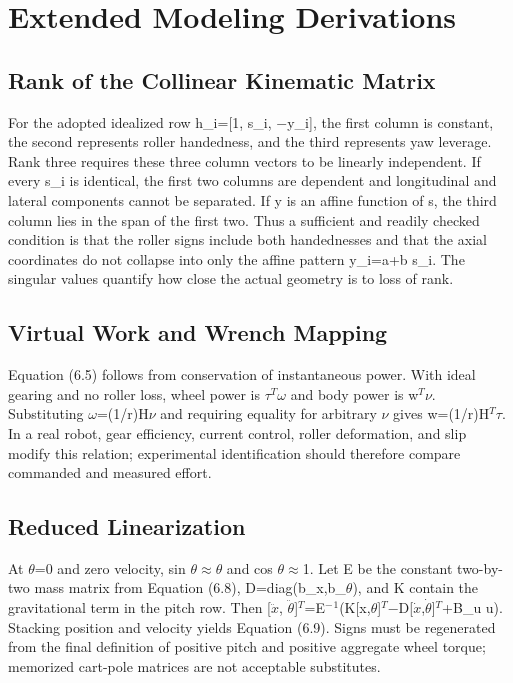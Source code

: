 \chapter{Extended Modeling Derivations}\label{ch:extended-modeling-derivations}

\section{Rank of the Collinear Kinematic Matrix}\label{f.1-rank-of-the-collinear-kinematic-matrix}

For the adopted idealized row h\_i=[1, s\_i, \ensuremath{-}y\_i], the first
column is constant, the second represents roller handedness, and the
third represents yaw leverage. Rank three requires these three column
vectors to be linearly independent. If every s\_i is identical, the
first two columns are dependent and longitudinal and lateral components
cannot be separated. If y is an affine function of s, the third column
lies in the span of the first two. Thus a sufficient and readily checked
condition is that the roller signs include both handednesses and that
the axial coordinates do not collapse into only the affine pattern
y\_i=a+b s\_i. The singular values quantify how close the actual
geometry is to loss of rank.

\section{Virtual Work and Wrench Mapping}\label{f.2-virtual-work-and-wrench-mapping}

Equation (6.5) follows from conservation of instantaneous power. With
ideal gearing and no roller loss, wheel power is \ensuremath{\tau}\ensuremath{^{T}}\ensuremath{\omega} and body power is
w\ensuremath{^{T}}\ensuremath{\nu}. Substituting \ensuremath{\omega}=(1\slash{}r)H\ensuremath{\nu} and requiring equality for arbitrary \ensuremath{\nu} gives
w=(1\slash{}r)H\ensuremath{^{T}}\ensuremath{\tau}. In a real robot, gear efficiency, current control, roller
deformation, and slip modify this relation; experimental identification
should therefore compare commanded and measured effort.

\section{Reduced Linearization}\label{f.3-reduced-linearization}

At \ensuremath{\theta}=0 and zero velocity, sin \ensuremath{\theta}\ensuremath{\approx}\ensuremath{\theta} and cos \ensuremath{\theta}\ensuremath{\approx}1. Let E be the constant
two-by-two mass matrix from Equation (6.8), D=diag(b\_x,b\_\ensuremath{\theta}), and K
contain the gravitational term in the pitch row. Then [\ensuremath{\ddot{x}},
\ensuremath{\ddot{\theta}}]\ensuremath{^{T}}=E\ensuremath{^{-}}\ensuremath{^{1}}(K[x,\ensuremath{\theta}]\ensuremath{^{T}}\ensuremath{-}D[\ensuremath{\dot{x}},\ensuremath{\dot{\theta}}]\ensuremath{^{T}}+B\_u u). Stacking position and
velocity yields Equation (6.9). Signs must be regenerated from the final
definition of positive pitch and positive aggregate wheel torque;
memorized cart-pole matrices are not acceptable substitutes.

